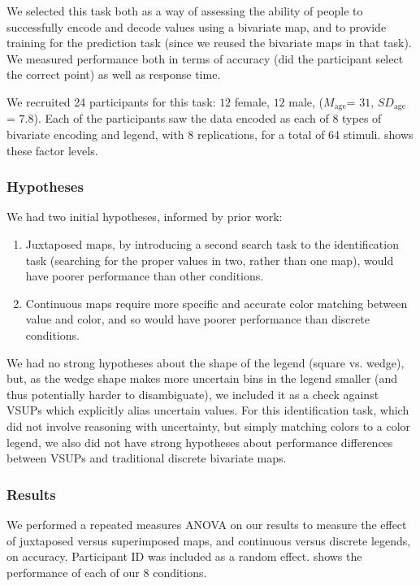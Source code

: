 We selected this task both as a way of assessing the ability of people to successfully encode and decode values using a bivariate map, and to provide training for the prediction task (since we reused the bivariate maps in that task). We measured performance both in terms of accuracy (did the participant select the correct point) as well as response time.

We recruited 24 participants for this task: $12$ female, $12$ male, ($M_{\text{age}}$= $31$, $SD_{\text{age}}$ = $7.8$). Each of the participants saw the data encoded as each of 8 types of bivariate encoding and legend, with 8 replications, for a total of 64 stimuli.  shows these factor levels.

\subsubsection{Hypotheses}

We had two initial hypotheses, informed by prior work:

\begin{enumerate}
	\item Juxtaposed maps, by introducing a second search task to the identification task (searching for the proper values in two, rather than one map), would have poorer performance than other conditions.
	\item Continuous maps require more specific and accurate color matching between value and color, and so would have poorer performance than discrete conditions.
\end{enumerate}

We had no strong hypotheses about the shape of the legend (square vs. wedge), but, as the wedge shape makes more uncertain bins in the legend smaller (and thus potentially harder to disambiguate), we included it as a check against VSUPs which explicitly alias uncertain values. For this identification task, which did not involve reasoning with uncertainty, but simply matching colors to a color legend, we also did not have strong hypotheses about performance differences between VSUPs and traditional discrete bivariate maps.

\subsubsection{Results}
\taskOneFig

We performed a repeated measures ANOVA on our results to measure the effect of juxtaposed versus superimposed maps, and continuous versus discrete legends, on accuracy. Participant ID was included as a random effect.  shows the performance of each of our 8 conditions.

